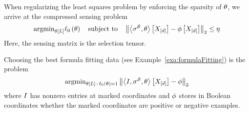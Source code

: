 







When regularizing the least squares problem by enforcing the sparsity of $\theta$, we arrive at the compressed sensing problem
\begin{align}
	\mathrm{argmin}_{\theta\left[L\right]} \ell_0\left(\theta\right) 
	\quad \text{subject to} \quad
	\left\| \left\langle \sigma^{\mathcal{S}},\theta\right\rangle \left[ X_{[d]} \right] - \phi\left[X_{[d]}\right] \right\|_2 \leq \eta
\end{align}
Here, the sensing matrix is the selection tensor.


\begin{example}
	Choosing the best formula fitting data (see Example~\ref{exa:formulaFitting}) is the problem
	\begin{align}
	\mathrm{argmin}_{\theta\left[L\right]\,:\,  \ell_0\left(\theta\right)=1} \left\| \left\langle I,\sigma^{\mathcal{S}},\theta\right\rangle \left[ X_{[d]} \right] - \phi \right\|_2
	\end{align}
	where $I$ has nonzero entries at marked coordinates and $\phi$ stores in Boolean coordinates whether the marked coordinates are positive or negative examples.
\end{example}

